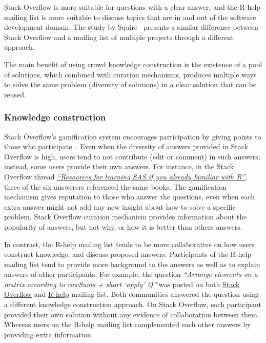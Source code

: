 \documentclass{sig-alternate-05-2015}
\begin{document}
Stack Overflow is more suitable for questions with a clear answer, and the R-help mailing list is more suitable to discuss topics that are in and out of the software development domain.
The study by Squire~\cite{Squire2015a} presents a similar difference between Stack Overflow and a mailing list of multiple projects through a different approach.

The main benefit of using crowd knowledge construction is the existence of a pool of solutions, which combined with curation mechanisms, produces multiple ways to solve the same problem (diversity of solutions) in a clear solution that can be reused.

	\subsubsection{Knowledge construction}

	Stack Overflow's gamification system encourages participation by giving points to those who participate~\cite{Singer2013}.
	Even when the diversity of answers provided in Stack Overflow is high, users tend to not contribute (edit or comment) in such answers; instead, some users provide their own answers.
	For instance, in the Stack Overflow thread \textit{\href{http://goo.gl/Mb4Pbk}{``Resources for learning SAS if you already familiar with R''}}, three of the six answerers referenced the same books.
	The gamification mechanism gives reputation to those who answer the questions, even when each extra answer might not add any new insight about how to solve a specific problem.
	Stack Overflow curation mechanism provides information about the popularity of answers, but not why, or how it is better than others answers.

	In contrast, the R-help mailing list tends to be more collaborative on how users construct knowledge, and discuss proposed answers.
	Participants of the R-help mailing list tend to provide more background to the answers as well as to explain answers of other participants.
	For example, the question \textit{``Arrange elements on a matrix according to rowSums + short `apply' Q''} was posted on both \href{http://goo.gl/a8AES8}{Stack Overflow} and \href{http://goo.gl/PGflT5}{R-help} mailing list.
	Both communities answered the question using a different knowledge construction approach.
	On Stack Overflow, each participant provided their own solution without any evidence of collaboration between them.
	Whereas users on the R-help mailing list complemented each other answers by providing extra information.
\end{document}
